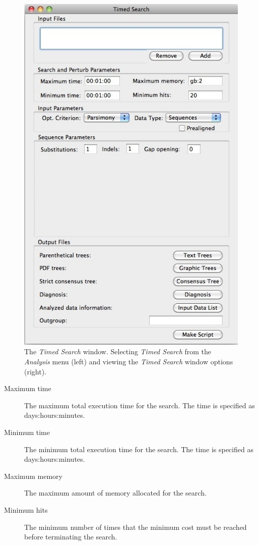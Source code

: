 {\begin{figure}
\begin{minipage}[c]{0.52\textwidth}
	   	\includegraphics[width=\textwidth]{doc/figures/timedsearch_window.jpg}
   	\end{minipage}
	
\caption{The \emph{Timed Search} window. Selecting \emph{Timed Search} from the \emph{Analysis} 
menu (left) and viewing the \emph{Timed Search} window options (right).}
\label{fig:timed_search}
\end{figure}

\begin{description}
    \item[Maximum time] The maximum total execution time for the search. The time is specified as
        days:hours:minutes.
    \item[Minimum time] The minimum total execution time for the search. The time is specified as
        days:hours:minutes.
    \item[Maximum memory] The maximum amount of memory allocated for the search.
    \item[Minimum hits] The minimum number of times that the minimum cost must be reached before terminating the search.
\end{description}

}
